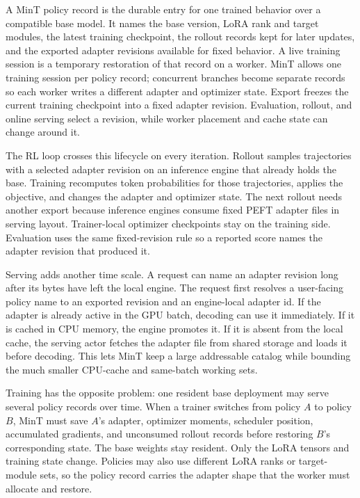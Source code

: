 A MinT policy record is the durable entry for one trained behavior over a compatible base model. It names the base version, LoRA rank and target modules, the latest training checkpoint, the rollout records kept for later updates, and the exported adapter revisions available for fixed behavior. A live training session is a temporary restoration of that record on a worker. MinT allows one training session per policy record; concurrent branches become separate records so each worker writes a different adapter and optimizer state. Export freezes the current training checkpoint into a fixed adapter revision. Evaluation, rollout, and online serving select a revision, while worker placement and cache state can change around it.

The RL loop crosses this lifecycle on every iteration. Rollout samples trajectories with a selected adapter revision on an inference engine that already holds the base. Training recomputes token probabilities for those trajectories, applies the objective, and changes the adapter and optimizer state. The next rollout needs another export because inference engines consume fixed PEFT adapter files in serving layout. Trainer-local optimizer checkpoints stay on the training side. Evaluation uses the same fixed-revision rule so a reported score names the adapter revision that produced it.

Serving adds another time scale. A request can name an adapter revision long after its bytes have left the local engine. The request first resolves a user-facing policy name to an exported revision and an engine-local adapter id. If the adapter is already active in the GPU batch, decoding can use it immediately. If it is cached in CPU memory, the engine promotes it. If it is absent from the local cache, the serving actor fetches the adapter file from shared storage and loads it before decoding. This lets MinT keep a large addressable catalog while bounding the much smaller CPU-cache and same-batch working sets.

Training has the opposite problem: one resident base deployment may serve several policy records over time. When a trainer switches from policy $A$ to policy $B$, MinT must save $A$'s adapter, optimizer moments, scheduler position, accumulated gradients, and unconsumed rollout records before restoring $B$'s corresponding state. The base weights stay resident. Only the LoRA tensors and training state change. Policies may also use different LoRA ranks or target-module sets, so the policy record carries the adapter shape that the worker must allocate and restore.

